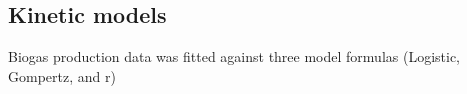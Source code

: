 \subsection{Kinetic models}
Biogas production data was fitted against three model formulas (Logistic, Gompertz, and r)